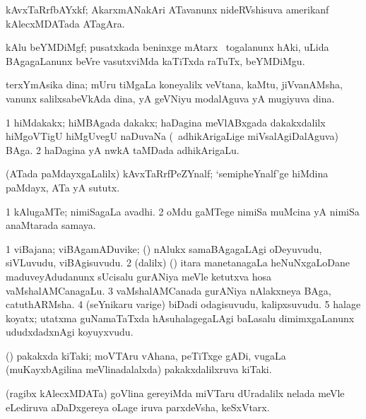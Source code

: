 \bentry
{}
\gl{\nA}
\bmng
kAvxTaRrfbAYxkf; AkarxmANakAri ATavanunx nideRVshisuva amerikanf kAlecxMDATada ATagAra. 
\emng
\eentry

\bentry
{}
\gl{\nA}
\bmng
kAlu beYMDiMgf; pusatxkada beninxge mAtarx \sA\ togalanunx hAki, uLida BAgagaLanunx beVre vasutxviMda kaTiTxda raTuTx, beYMDiMgu. 
\emng
\eentry

\bentry
{}
\gl{\nA}
\bmng
terxYmAsika dina; mUru tiMgaLa koneyalilx veVtana, kaMtu, jiVvanAMsha, \mo vanunx salilxsabeVkAda dina, yA geVNiyu modalAguva yA mugiyuva dina. 
\emng
\eentry

\bentry
{}
\gl{\nA}
\bmng
\bnum
\num{1} hiMdakakx; hiMBAgada dakakx; haDagina meVlABxgada dakakxdalilx hiMgoVTigU hiMgUvegU naDuvaNa (\sA\ adhikArigaLige miVsalAgiDalAguva) BAga. 
\num{2} haDagina yA nwkA taMDada adhikArigaLu. 
\enum
\emng
\eentry

\bentry
{}
\gl{\nA}
\bmng
(ATada paMdayxgaLalilx) kAvxTaRrfPeZYnalf; `semipheYnalf'ge hiMdina paMdayx, ATa yA sututx. 
\emng
\eentry

\bentry
{}
\gl{\nA}
\bmng
\bnum
\num{1} kAlugaMTe;  nimiSagaLa avadhi. 
\num{2} oMdu gaMTege  nimiSa muMcina yA  nimiSa anaMtarada samaya. 
\enum
\emng
\eentry

\bentry
{}
\gl{\nA}
\bmng
\bnum
\num{1} viBajana; viBAgamADuvike; (\kanmu) nAlukx samaBAgagaLAgi oDeyuvudu, siVLuvudu, viBAgisuvudu. 
\num{2} (\bava dalilx) (\vaMlAM) itara manetanagaLa heNuNxgaLoDane maduveyAdudanunx sUcisalu gurANiya meVle ketutxva hosa vaMshalAMCanagaLu. 
\num{3} vaMshalAMCanada gurANiya nAlakxneya BAga, catuthARMsha. 
\num{4} (seYnikaru \mo varige) biDadi odagisuvudu, kalipxsuvudu. 
\num{5} halage koyatx; utatxma guNamaTaTxda hAsuhalagegaLAgi baLasalu dimimxgaLanunx ududxdadxnAgi koyuyxvudu. 
\enum
\emng
\eentry

\bentry
{}
\gl{\nA}
\bmng
(\birx) pakakxda kiTaki; moVTAru vAhana, peTiTxge gADi, \mo vugaLa (muKayxbAgilina meVlinadalalxda) pakakxdalilxruva kiTaki. 
\emng
\eentry

\bentry
{}
\gl{\nA}
\bmng
(ragibx kAlecxMDATa) goVlina gereyiMda  miVTaru dUradalilx nelada meVle eLediruva aDaDxgereya oLage iruva parxdeVsha, keSxVtarx. 
\emng
\eentry

